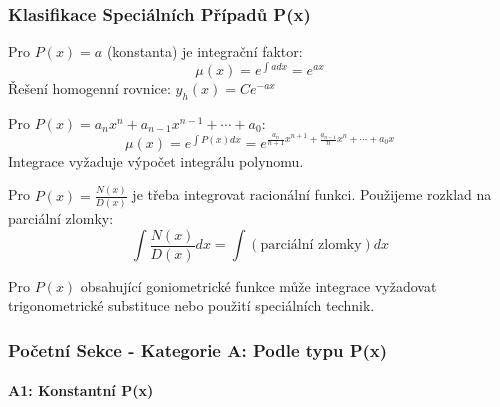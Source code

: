 \vspace{0.8\baselineskip}

\subsubsection{Klasifikace Speciálních Případů P(x)}
\label{subsubsec:klasifikace-px}

\begin{remark}[Konstantní P(x)]
Pro $P(x) = a$ (konstanta) je integrační faktor:
\[
\mu(x) = e^{\int a  dx} = e^{ax}
\]
Řešení homogenní rovnice: $y_h(x) = Ce^{-ax}$
\end{remark}

\vspace{0.6\baselineskip}

\begin{remark}[Polynomiální P(x)]
Pro $P(x) = a_nx^n + a_{n-1}x^{n-1} + \cdots + a_0$:
\[
\mu(x) = e^{\int P(x)dx} = e^{\frac{a_n}{n+1}x^{n+1} + \frac{a_{n-1}}{n}x^n + \cdots + a_0x}
\]
Integrace vyžaduje výpočet integrálu polynomu.
\end{remark}

\vspace{0.6\baselineskip}

\begin{remark}[Racionální P(x)]
Pro $P(x) = \frac{N(x)}{D(x)}$ je třeba integrovat racionální funkci. Použijeme rozklad na parciální zlomky:
\[
\int \frac{N(x)}{D(x)} dx = \int \left(\text{parciální zlomky}\right) dx
\]
\end{remark}

\vspace{0.6\baselineskip}

\begin{remark}[Goniometrické P(x)]
Pro $P(x)$ obsahující goniometrické funkce může integrace vyžadovat trigonometrické substituce nebo použití speciálních technik.
\end{remark}

\vspace{0.8\baselineskip}

\subsubsection{Početní Sekce - Kategorie A: Podle typu P(x)}
\label{subsubsec:pocetni-kategorie-a}

\paragraph*{A1: Konstantní P(x)}

